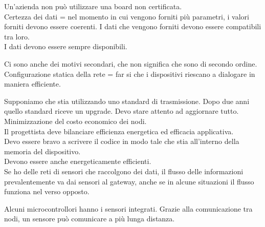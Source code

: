 \documentclass{article}
\begin{document}
    Un'azienda non può utilizzare una board non certificata.\\
    Certezza dei dati = nel momento in cui vengono forniti più parametri, i valori forniti devono essere coerenti. I dati che vengono forniti devono essere compatibili tra loro.\\
    I dati devono essere sempre disponibili.

    Ci sono anche dei motivi secondari, che non significa che sono di secondo ordine.\\
    Configurazione statica della rete = far si che i dispositivi riescano a dialogare in maniera efficiente.
    
    Supponiamo che stia utilizzando uno standard di trasmissione. Dopo due anni quello standard riceve un upgrade. Devo stare attento ad aggiornare tutto.\\
    Minimizzazione del costo economico dei nodi.\\
    Il progettista deve bilanciare efficienza energetica ed efficacia applicativa.\\
    Devo essere bravo a scrivere il codice in modo tale che stia all'interno della memoria del dispositivo.\\
    Devono essere anche energeticamente efficienti.\\
    Se ho delle reti di sensori che raccolgono dei dati, il flusso delle informazioni prevalentemente va dai sensori al gateway, anche se in alcune situazioni il flusso funziona nel verso opposto.

    Alcuni microcontrollori hanno i sensori integrati.
    Grazie alla comunicazione tra nodi, un sensore può comunicare a più lunga distanza.
\end{document}
